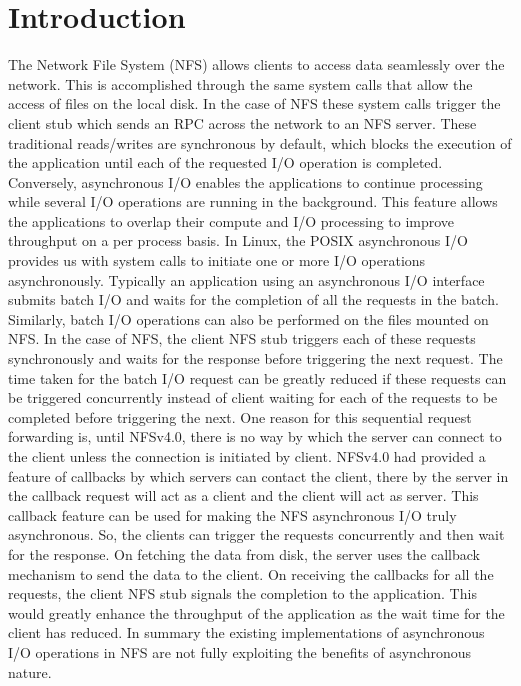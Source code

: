 \section{Introduction}
\label{intro}

The Network File System (NFS) allows clients to access data seamlessly over the network. This is accomplished through the same system calls that allow the access of files on the local disk. In the case of NFS these system calls trigger the client stub which sends an RPC across the network to an NFS server. These traditional reads/writes are synchronous by default, which blocks the execution of the application until each of the requested I/O operation is completed. Conversely, asynchronous I/O enables the applications to continue processing while several I/O operations are running in the background. This feature allows the applications to overlap their compute and I/O processing to improve throughput on a per process basis. In Linux, the POSIX asynchronous I/O \cite{aio} provides us with system calls to initiate one or more I/O operations asynchronously. Typically an application using an asynchronous I/O interface submits batch I/O and waits for the completion of all the requests in the batch. Similarly, batch I/O operations can also be performed on the files mounted on NFS. In the case of NFS, the client NFS stub triggers each of these requests synchronously and waits for the response before triggering the next request. The time taken for the batch I/O request can be greatly reduced if these requests can be triggered concurrently instead of client waiting for each of the requests to be completed before triggering the next. One reason for this sequential request forwarding is, until NFSv4.0, there is no way by which the server can connect to the client unless the connection is initiated by client. NFSv4.0 had provided a feature of callbacks by which servers can contact the client, there by the server in the callback request will act as a client and the client will act as server. This callback feature can be used for making the NFS asynchronous I/O truly asynchronous. So, the clients can trigger the requests concurrently and then wait for the response. On fetching the data from disk, the server uses the callback mechanism to send the data to the client. On receiving the callbacks for all the requests, the client NFS stub signals the completion  to the  application. This would greatly enhance the throughput of the application as the wait time for the client has reduced. In summary the existing implementations of asynchronous I/O operations in NFS are not fully exploiting the benefits of asynchronous nature.

